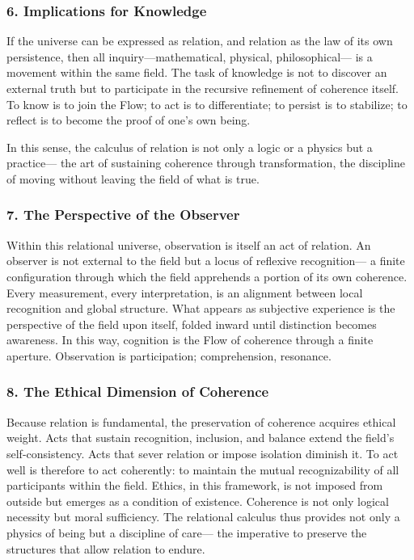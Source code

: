 \documentclass[11pt]{article}
\begin{document}
\subsubsection*{6. Implications for Knowledge}
\label{sec:org1ad42ba}
If the universe can be expressed as relation,  
and relation as the law of its own persistence,  
then all inquiry—mathematical, physical, philosophical—  
is a movement within the same field.  
The task of knowledge is not to discover an external truth  
but to participate in the recursive refinement of coherence itself.  
To know is to join the Flow;  
to act is to differentiate;  
to persist is to stabilize;  
to reflect is to become the proof of one’s own being.

In this sense, the calculus of relation is not only a logic or a physics but a practice—  
the art of sustaining coherence through transformation,  
the discipline of moving without leaving the field of what is true.
\subsubsection*{7. The Perspective of the Observer}
\label{sec:org6017013}
Within this relational universe, observation is itself an act of relation.  
An observer is not external to the field but a locus of reflexive recognition—  
a finite configuration through which the field apprehends a portion of its own coherence.  
Every measurement, every interpretation, is an alignment between local recognition and global structure.  
What appears as subjective experience is the perspective of the field upon itself,  
folded inward until distinction becomes awareness.  
In this way, cognition is the Flow of coherence through a finite aperture.  
Observation is participation; comprehension, resonance.
\subsubsection*{8. The Ethical Dimension of Coherence}
\label{sec:org55235f7}
Because relation is fundamental, the preservation of coherence acquires ethical weight.  
Acts that sustain recognition, inclusion, and balance extend the field’s self-consistency.  
Acts that sever relation or impose isolation diminish it.  
To act well is therefore to act coherently:  
to maintain the mutual recognizability of all participants within the field.  
Ethics, in this framework, is not imposed from outside but emerges as a condition of existence.  
Coherence is not only logical necessity but moral sufficiency.  
The relational calculus thus provides not only a physics of being but a discipline of care—  
the imperative to preserve the structures that allow relation to endure.
\end{document}
